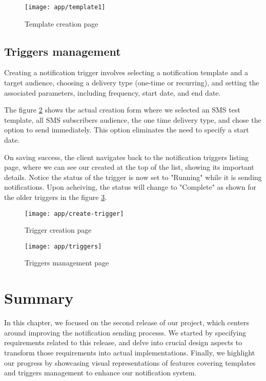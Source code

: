 \begin{figure}[hbt!]
    \centering
    \texttt{[image: app/template1]}
    \caption{Template creation page}
    \label{ss-template}
\end{figure}

\subsection{Triggers management}
Creating a notification trigger involves selecting a notification template and a target audience,
choosing a delivery type (one-time or recurring), and setting the associated parameters, including frequency,
start date, and end date.

The figure \ref{ss-create-trigger} shows the actual creation form where we selected an SMS test template,
all SMS subscribers audience, the one time delivery type, and chose the option to send immediately.
This option eliminates the need to specify a start date.

On saving success, the client navigates back to the notification triggers listing page, where we can
see our created at the top of the list, showing its important details. Notice the status of the trigger
is now set to "Running" while it is sending notifications. Upon acheiving, the status will change to "Complete"
as shown for the older triggers in the figure \ref{ss-triggers}.


\begin{figure}[hbt!]
    \centering
    \texttt{[image: app/create-trigger]}
    \caption{Trigger creation page}
    \label{ss-create-trigger}
\end{figure}

\begin{figure}[hbt!]
    \centering
    \texttt{[image: app/triggers]}
    \caption{Triggers management page}
    \label{ss-triggers}
\end{figure}


\section*{Summary}


In this chapter, we focused on the second release of our project, which centers around improving
the notification sending processs. We started by specifying requirements related to this release,
and delve into crucial design aspects to transform those requirements into actual implementations.
Finally, we highlight our progress by showcasing visual representations of features covering
templates and triggers management to enhance our notification system.
